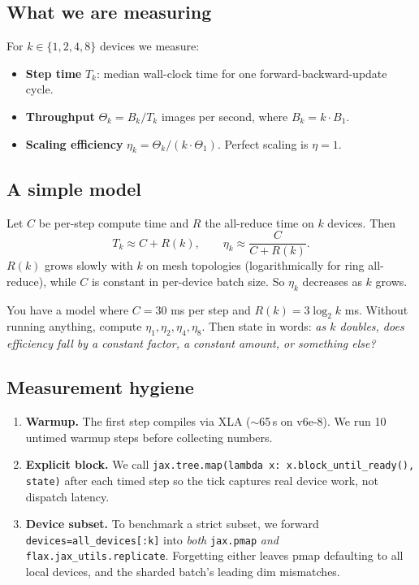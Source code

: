 \documentclass[11pt,a4paper]{article}
\newcommand{\answerspace}[1][3]{\vspace{#1\baselineskip}}
\begin{document}
\subsection{What we are measuring}

For $k \in \{1, 2, 4, 8\}$ devices we measure:

\begin{itemize}
\item \textbf{Step time} $T_k$: median wall-clock time for one forward-backward-update cycle.
\item \textbf{Throughput} $\Theta_k = B_k / T_k$ images per second, where $B_k = k \cdot B_1$.
\item \textbf{Scaling efficiency} $\eta_k = \Theta_k / (k \cdot \Theta_1)$. Perfect scaling is
      $\eta = 1$.
\end{itemize}

\subsection{A simple model}

Let $C$ be per-step compute time and $R$ the all-reduce time on $k$ devices. Then
$$
T_k \approx C + R(k), \qquad \eta_k \approx \frac{C}{C + R(k)}.
$$
$R(k)$ grows slowly with $k$ on mesh topologies (logarithmically for ring all-reduce),
while $C$ is constant in per-device batch size. So $\eta_k$ decreases as $k$ grows.

\begin{predict}
You have a model where $C = 30$ ms per step and $R(k) = 3 \log_2 k$ ms.
Without running anything, compute $\eta_1, \eta_2, \eta_4, \eta_8$.
Then state in words: \emph{as $k$ doubles, does efficiency fall by a constant factor, a
constant amount, or something else?}
\answerspace[4]
\end{predict}

\subsection{Measurement hygiene}

\begin{enumerate}
\item \textbf{Warmup.} The first step compiles via XLA ($\sim$65\,s on v6e-8). We run 10
      untimed warmup steps before collecting numbers.
\item \textbf{Explicit block.} We call
      \texttt{jax.tree.map(lambda x: x.block\_until\_ready(), state)} after each timed step
      so the tick captures real device work, not dispatch latency.
\item \textbf{Device subset.} To benchmark a strict subset, we forward
      \texttt{devices=all\_devices[:k]} into \emph{both} \texttt{jax.pmap} \emph{and}
      \texttt{flax.jax\_utils.replicate}. Forgetting either leaves pmap defaulting to all
      local devices, and the sharded batch's leading dim mismatches.
\end{enumerate}
\end{document}
